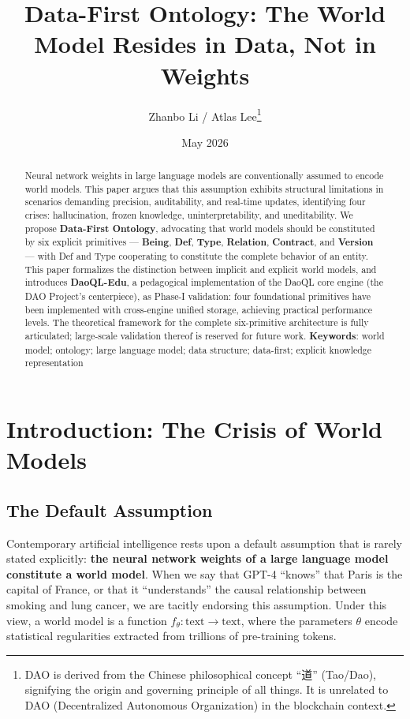 \documentclass[11pt,a4paper]{article}
\title{Data-First Ontology: The World Model Resides in Data, Not in Weights}
\author{Zhanbo Li / Atlas Lee\thanks{DAO is derived from the  Chinese philosophical concept ``道'' (Tao/Dao), signifying the origin  and governing principle of all things. It is unrelated to DAO  (Decentralized Autonomous Organization) in the blockchain context.}}
\affil{DAO Project}
\date{May 2026}
\begin{document}
\maketitle

\begin{abstract}
Neural network weights in large language models are conventionally
assumed to encode world models. This paper argues that this assumption
exhibits structural limitations in scenarios demanding precision,
auditability, and real-time updates, identifying four crises:
hallucination, frozen knowledge, uninterpretability, and uneditability.
We propose \textbf{Data-First Ontology}, advocating that world models
should be constituted by six explicit primitives --- \textbf{Being},
\textbf{Def}, \textbf{Type}, \textbf{Relation}, \textbf{Contract}, and
\textbf{Version} --- with Def and Type cooperating to constitute the
complete behavior of an entity. This paper formalizes the distinction
between implicit and explicit world models, and introduces
\textbf{DaoQL-Edu}, a pedagogical implementation of the DaoQL core
engine (the DAO Project's centerpiece), as Phase-I validation: four
foundational primitives have been implemented with cross-engine unified
storage, achieving practical performance levels. The theoretical
framework for the complete six-primitive architecture is fully
articulated; large-scale validation thereof is reserved for future work.
\textbf{Keywords}: world model; ontology; large language model; data
structure; data-first; explicit knowledge representation
\end{abstract}

\section{Introduction: The Crisis of World
Models}\label{introduction-the-crisis-of-world-models}

\subsection{The Default Assumption}\label{the-default-assumption}

Contemporary artificial intelligence rests upon a default assumption
that is rarely stated explicitly: \textbf{the neural network weights of
a large language model constitute a world model}. When we say that GPT-4
``knows'' that Paris is the capital of France, or that it
``understands'' the causal relationship between smoking and lung cancer,
we are tacitly endorsing this assumption. Under this view, a world model
is a function \(f_\theta: \text{text} \rightarrow \text{text}\), where
the parameters \(\theta\) encode statistical regularities extracted from
trillions of pre-training tokens.
\end{document}
